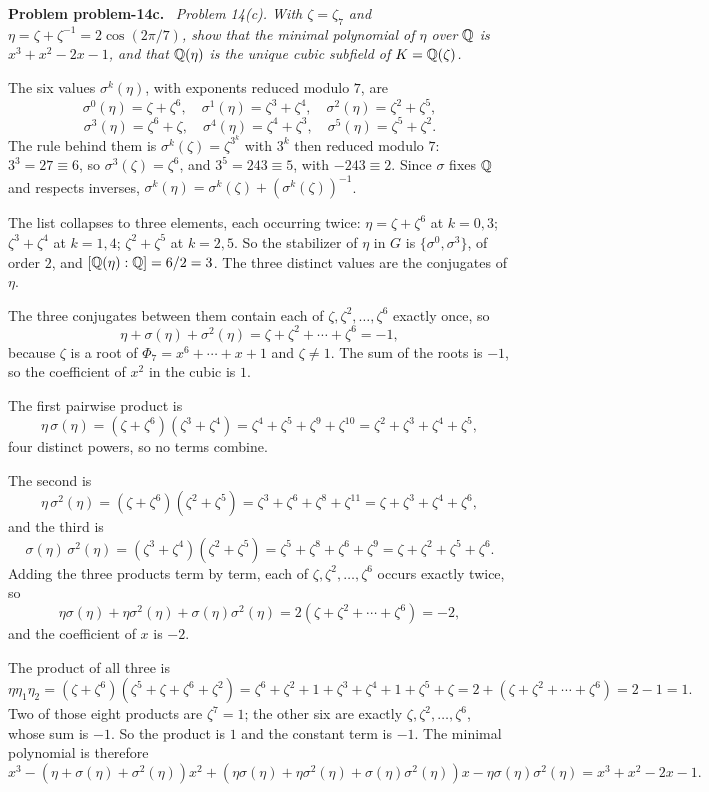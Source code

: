\documentclass[11pt]{article}
\newenvironment{problem}[1]
  {\par\medskip\noindent\textbf{Problem #1.}\ \itshape}
  {\par\medskip}
\begin{document}
\begin{problem}{problem-14c}
Problem 14(c). With $\zeta=\zeta_7$ and $\eta=\zeta+\zeta^{-1}=2\cos(2\pi/7)$, show that the minimal polynomial of $\eta$ over $\mathbb{Q}$ is $x^3+x^2-2x-1$, and that $\mathbb{Q}(\eta)$ is the unique cubic subfield of $K=\mathbb{Q}(\zeta)$.
\end{problem}
The six values $\sigma^k(\eta)$, with exponents reduced modulo $7$, are
\[
\sigma^0(\eta)=\zeta+\zeta^6,\quad
\sigma^1(\eta)=\zeta^3+\zeta^4,\quad
\sigma^2(\eta)=\zeta^2+\zeta^5,
\]
\[
\sigma^3(\eta)=\zeta^6+\zeta,\quad
\sigma^4(\eta)=\zeta^4+\zeta^3,\quad
\sigma^5(\eta)=\zeta^5+\zeta^2.
\]
The rule behind them is $\sigma^k(\zeta)=\zeta^{3^k}$ with $3^k$ then reduced modulo $7$: $3^3=27\equiv 6$, so $\sigma^3(\zeta)=\zeta^6$, and $3^5=243\equiv 5$, with $-243\equiv 2$. Since $\sigma$ fixes $\mathbb{Q}$ and respects inverses, $\sigma^k(\eta)=\sigma^k(\zeta)+(\sigma^k(\zeta))^{-1}$.

The list collapses to three elements, each occurring twice: $\eta=\zeta+\zeta^6$ at $k=0,3$; $\zeta^3+\zeta^4$ at $k=1,4$; $\zeta^2+\zeta^5$ at $k=2,5$. So the stabilizer of $\eta$ in $G$ is $\{\sigma^0,\sigma^3\}$, of order $2$, and $[\mathbb{Q}(\eta):\mathbb{Q}]=6/2=3$. The three distinct values are the conjugates of $\eta$.

The three conjugates between them contain each of $\zeta,\zeta^2,\dots,\zeta^6$ exactly once, so
\[
\eta+\sigma(\eta)+\sigma^2(\eta)=\zeta+\zeta^2+\cdots+\zeta^6=-1,
\]
because $\zeta$ is a root of $\Phi_7=x^6+\cdots+x+1$ and $\zeta\ne1$. The sum of the roots is $-1$, so the coefficient of $x^2$ in the cubic is $1$.

The first pairwise product is
\[
\eta\,\sigma(\eta)=(\zeta+\zeta^6)(\zeta^3+\zeta^4)=\zeta^4+\zeta^5+\zeta^9+\zeta^{10}=\zeta^2+\zeta^3+\zeta^4+\zeta^5,
\]
four distinct powers, so no terms combine.

The second is
\[
\eta\,\sigma^2(\eta)=(\zeta+\zeta^6)(\zeta^2+\zeta^5)=\zeta^3+\zeta^6+\zeta^{8}+\zeta^{11}=\zeta+\zeta^3+\zeta^4+\zeta^6,
\]
and the third is
\[
\sigma(\eta)\,\sigma^2(\eta)=(\zeta^3+\zeta^4)(\zeta^2+\zeta^5)=\zeta^5+\zeta^{8}+\zeta^{6}+\zeta^{9}=\zeta+\zeta^2+\zeta^5+\zeta^6.
\]
Adding the three products term by term, each of $\zeta,\zeta^2,\dots,\zeta^6$ occurs exactly twice, so
\[
\eta\sigma(\eta)+\eta\sigma^2(\eta)+\sigma(\eta)\sigma^2(\eta)=2(\zeta+\zeta^2+\cdots+\zeta^6)=-2,
\]
and the coefficient of $x$ is $-2$.

The product of all three is
\[
\eta\eta_1\eta_2=(\zeta+\zeta^{6})(\zeta^{5}+\zeta+\zeta^{6}+\zeta^{2})
=\zeta^{6}+\zeta^{2}+1+\zeta^{3}+\zeta^{4}+1+\zeta^{5}+\zeta
=2+(\zeta+\zeta^{2}+\cdots+\zeta^{6})=2-1=1.
\]
Two of those eight products are $\zeta^{7}=1$; the other six are exactly $\zeta,\zeta^{2},\dots,\zeta^{6}$, whose sum is $-1$. So the product is $1$ and the constant term is $-1$. The minimal polynomial is therefore
\[
x^{3}-(\eta+\sigma(\eta)+\sigma^{2}(\eta))x^{2}+(\eta\sigma(\eta)+\eta\sigma^{2}(\eta)+\sigma(\eta)\sigma^{2}(\eta))x-\eta\sigma(\eta)\sigma^{2}(\eta)
=x^{3}+x^{2}-2x-1.
\]
\end{document}
